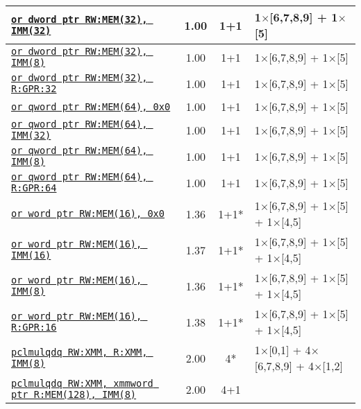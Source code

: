 \documentclass[a4paper,english,fontsize=9]{scrartcl}
\begin{document}
\begin{longtable}{p{}ccL{.25\textwidth}}
  \texttt{\href{https://felixcloutier.com/x86/OR.html}{or dword ptr RW:MEM(32), IMM(32)}} & 1.00 & 1+1 & 1\(\times\)[6,7,8,9] + 1\(\times\)[5] \\
  \midrule
  \texttt{\href{https://felixcloutier.com/x86/OR.html}{or dword ptr RW:MEM(32), IMM(8)}} & 1.00 & 1+1 & 1\(\times\)[6,7,8,9] + 1\(\times\)[5] \\
  \midrule
  \texttt{\href{https://felixcloutier.com/x86/OR.html}{or dword ptr RW:MEM(32), R:GPR:32}} & 1.00 & 1+1 & 1\(\times\)[6,7,8,9] + 1\(\times\)[5] \\
  \midrule
  \texttt{\href{https://felixcloutier.com/x86/OR.html}{or qword ptr RW:MEM(64), 0x0}} & 1.00 & 1+1 & 1\(\times\)[6,7,8,9] + 1\(\times\)[5] \\
  \midrule
  \texttt{\href{https://felixcloutier.com/x86/OR.html}{or qword ptr RW:MEM(64), IMM(32)}} & 1.00 & 1+1 & 1\(\times\)[6,7,8,9] + 1\(\times\)[5] \\
  \midrule
  \texttt{\href{https://felixcloutier.com/x86/OR.html}{or qword ptr RW:MEM(64), IMM(8)}} & 1.00 & 1+1 & 1\(\times\)[6,7,8,9] + 1\(\times\)[5] \\
  \midrule
  \texttt{\href{https://felixcloutier.com/x86/OR.html}{or qword ptr RW:MEM(64), R:GPR:64}} & 1.00 & 1+1 & 1\(\times\)[6,7,8,9] + 1\(\times\)[5] \\
  \midrule
  \texttt{\href{https://felixcloutier.com/x86/OR.html}{or word ptr RW:MEM(16), 0x0}} & 1.36 & 1+1* & 1\(\times\)[6,7,8,9] + 1\(\times\)[5] + 1\(\times\)[4,5] \\
  \midrule
  \texttt{\href{https://felixcloutier.com/x86/OR.html}{or word ptr RW:MEM(16), IMM(16)}} & 1.37 & 1+1* & 1\(\times\)[6,7,8,9] + 1\(\times\)[5] + 1\(\times\)[4,5] \\
  \midrule
  \texttt{\href{https://felixcloutier.com/x86/OR.html}{or word ptr RW:MEM(16), IMM(8)}} & 1.36 & 1+1* & 1\(\times\)[6,7,8,9] + 1\(\times\)[5] + 1\(\times\)[4,5] \\
  \midrule
  \texttt{\href{https://felixcloutier.com/x86/OR.html}{or word ptr RW:MEM(16), R:GPR:16}} & 1.38 & 1+1* & 1\(\times\)[6,7,8,9] + 1\(\times\)[5] + 1\(\times\)[4,5] \\
  \midrule
  \texttt{\href{https://felixcloutier.com/x86/PCLMULQDQ.html}{pclmulqdq RW:XMM, R:XMM, IMM(8)}} & 2.00 & 4* & 1\(\times\)[0,1] + 4\(\times\)[6,7,8,9] + 4\(\times\)[1,2] \\
  \midrule
  \texttt{\href{https://felixcloutier.com/x86/PCLMULQDQ.html}{pclmulqdq RW:XMM, xmmword ptr R:MEM(128), IMM(8)}} & 2.00 & 4+1 &  \\

\end{longtable}
\end{document}
